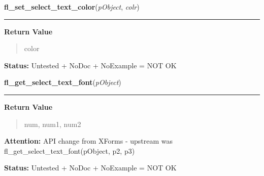     \vspace{0.5ex}

\hspace{.8\funcindent}\begin{boxedminipage}{\funcwidth}

    \raggedright \textbf{fl\_set\_select\_text\_color}(\textit{pObject}, \textit{colr})

    \vspace{-1.5ex}

    \rule{\textwidth}{0.5\fboxrule}
\setlength{\parskip}{2ex}
\setlength{\parskip}{1ex}
      \textbf{Return Value}
    \vspace{-1ex}

      \begin{quote}
      color

      \end{quote}

\textbf{Status:} Untested + NoDoc + NoExample = NOT OK



    \end{boxedminipage}

    \label{xformslib:library:fl_get_select_text_font}

    \vspace{0.5ex}

\hspace{.8\funcindent}\begin{boxedminipage}{\funcwidth}

    \raggedright \textbf{fl\_get\_select\_text\_font}(\textit{pObject})

    \vspace{-1.5ex}

    \rule{\textwidth}{0.5\fboxrule}
\setlength{\parskip}{2ex}
\setlength{\parskip}{1ex}
      \textbf{Return Value}
    \vspace{-1ex}

      \begin{quote}
      num, num1, num2

      \end{quote}

\textbf{Attention:} API change from XForms - upstream was fl\_get\_select\_text\_font(pObject, 
p2, p3)



\textbf{Status:} Untested + NoDoc + NoExample = NOT OK



    \end{boxedminipage}


